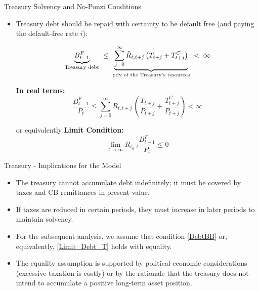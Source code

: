 \documentclass[11pt,aspectratio=169]{beamer}
\begin{document}
\begin{frame}{Treasury Solvency and No-Ponzi Conditions} 
\small
\begin{itemize}
\item Treasury debt should be repaid with certainty to be default free (and paying the default-free rate $i$):

\begin{equation*}
\underbrace{B_{t-1}^{F}}_{\text{\scriptsize Treasury debt}}
\;\le\;
\underbrace{\sum_{j=0}^{\infty} 
\tilde{R}_{t,t+j}\,\big(T_{t+j}+T_{t+j}^{C}\big)}_{\text{\scriptsize pdv of the Treasury's resources}}
\;<\;\infty
\end{equation*}

\noindent\textbf{In real terms:} 
\begin{equation} \frac{B_{t-1}^{F}}{P_t} \le \sum_{j=0}^{\infty} R_{t,t+j}\,\left(\frac{T_{t+j}}{P_{t+j}} + \frac{T_{t+j}^C}{P_{t+j}}\right) < \infty \label{DebtBB} \end{equation} 

\noindent or equivalently \textbf{Limit Condition:} 
\begin{equation} \lim_{t\to\infty} R_{t_0,t} \frac{B_{t-1}^F}{P_t} \le 0 \label{Limit_Debt_T} \end{equation}
\end{itemize}

\end{frame}


\begin{frame}{Treasury - Implications for the Model}

\begin{itemize}
    \item The treasury cannot accumulate debt indefinitely; it must be covered by taxes and CB remittances in present value.
    \item If taxes are reduced in certain periods, they must increase in later periods to maintain solvency.
    \item For the subsequent analysis, we assume that condition \eqref{DebtBB} or, equivalently, \eqref{Limit_Debt_T} holds with equality.
    \item The equality assumption is supported by political-economic considerations (excessive taxation is costly) or by the rationale that the treasury does not intend to accumulate a positive long-term asset position.

\end{itemize}

\end{frame}
\end{document}

